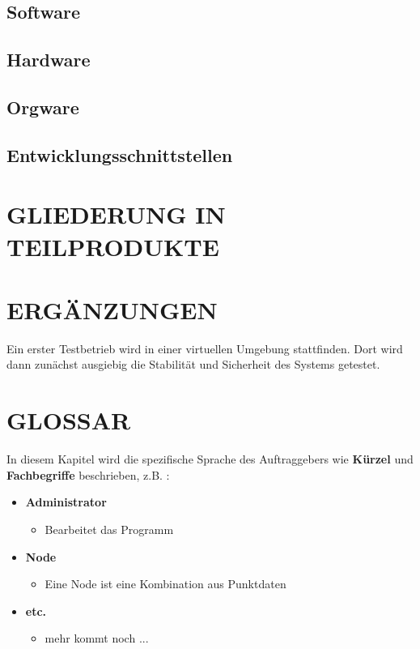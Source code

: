 	\subsection{Software}
	\subsection{Hardware}
	\subsection{Orgware}
	\subsection{Entwicklungsschnittstellen}
	
	
	\section{\Large GLIEDERUNG IN TEILPRODUKTE}
	
	
	\section{\Large ERGÄNZUNGEN}
	Ein erster Testbetrieb wird in einer virtuellen Umgebung stattfinden. Dort wird dann zunächst ausgiebig die Stabilität und Sicherheit des Systems getestet.
	
	
	\section{\Large GLOSSAR}
	In diesem Kapitel wird die spezifische Sprache des Auftraggebers wie \textbf{ Kürzel } und \textbf{ Fachbegriffe } beschrieben, z.B. :
	\begin{itemize}
		\item \textbf{ Administrator }
		\begin{itemize}
			\item Bearbeitet das Programm
		\end{itemize}
	\end{itemize}
	\begin{itemize}
		\item \textbf{ Node }
		\begin{itemize}
			\item Eine Node ist eine Kombination aus Punktdaten
		\end{itemize}
	\end{itemize}
	\begin{itemize}
		\item \textbf{ etc. }
		\begin{itemize}
			\item mehr kommt noch ...
		\end{itemize}
	\end{itemize}

		